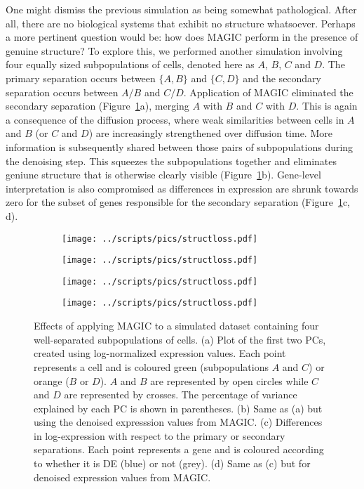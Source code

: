 \documentclass[10pt,letterpaper]{article}
\begin{document}
One might dismiss the previous simulation as being somewhat pathological.
After all, there are no biological systems that exhibit no structure whatsoever.
Perhaps a more pertinent question would be: how does MAGIC perform in the presence of genuine structure? 
To explore this, we performed another simulation involving four equally sized subpopulations of cells, denoted here as $A$, $B$, $C$ and $D$.
The primary separation occurs between $\{A, B\}$ and $\{C, D\}$ and the secondary separation occurs between $A/B$ and $C/D$.
Application of MAGIC eliminated the secondary separation (Figure~\ref{fig:fourclusters}a), merging $A$ with $B$ and $C$ with $D$.
This is again a consequence of the diffusion process, where weak similarities between cells in $A$ and $B$ (or $C$ and $D$) are increasingly strengthened over diffusion time.
More information is subsequently shared between those pairs of subpopulations during the denoising step.
This squeezes the subpopulations together and eliminates geniune structure that is otherwise clearly visible (Figure~\ref{fig:fourclusters}b).
Gene-level interpretation is also compromised as differences in expression are shrunk towards zero for the subset of genes responsible for the secondary separation (Figure~\ref{fig:fourclusters}c, d).

\begin{figure}[btp]
\centering
\begin{subfigure}[b]{0.49\textwidth}
    \texttt{[image: ../scripts/pics/structloss.pdf]}
    \caption{}
\end{subfigure}
\begin{subfigure}[b]{0.49\textwidth}
    \texttt{[image: ../scripts/pics/structloss.pdf]}
    \caption{}
\end{subfigure}
\begin{subfigure}[b]{0.49\textwidth}
    \texttt{[image: ../scripts/pics/structloss.pdf]}
    \caption{}
\end{subfigure}
\begin{subfigure}[b]{0.49\textwidth}
    \texttt{[image: ../scripts/pics/structloss.pdf]}
    \caption{}
\end{subfigure}
\caption{Effects of applying MAGIC to a simulated dataset containing four well-separated subpopulations of cells.
(a) Plot of the first two PCs, created using log-normalized expression values.
Each point represents a cell and is coloured green (subpopulations $A$ and $C$) or orange ($B$ or $D$).
$A$ and $B$ are represented by open circles while $C$ and $D$ are represented by crosses.
The percentage of variance explained by each PC is shown in parentheses.
(b) Same as (a) but using the denoised expresssion values from MAGIC.
(c) Differences in log-expression with respect to the primary or secondary separations.
Each point represents a gene and is coloured according to whether it is DE (blue) or not (grey).
(d) Same as (c) but for denoised expression values from MAGIC.}
\label{fig:fourclusters}
\end{figure}
\end{document}
